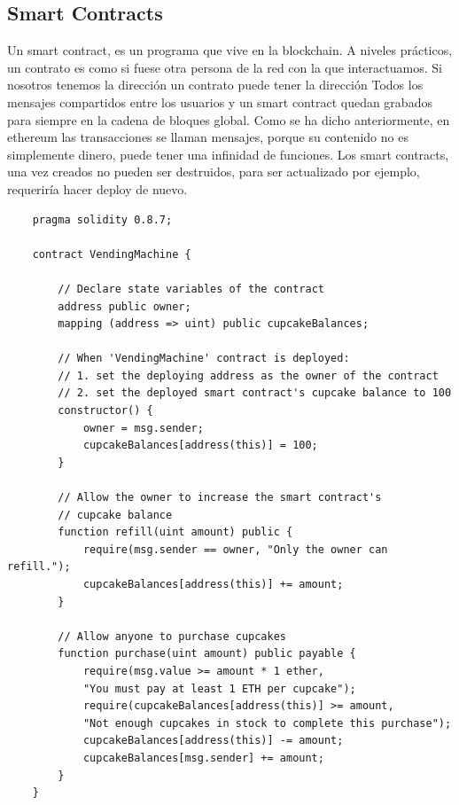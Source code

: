 \subsection*{Smart Contracts}
Un smart contract, es un programa que vive en la blockchain. A niveles prácticos, un contrato es como si fuese otra persona de la red con la que interactuamos.
Si nosotros tenemos la dirección
un contrato puede tener la dirección
Todos los mensajes compartidos entre los usuarios y un smart contract quedan grabados para siempre en la cadena de bloques global. Como se ha dicho anteriormente, en ethereum las transacciones se llaman mensajes, porque su contenido no es simplemente dinero, puede tener una infinidad de funciones.
Los smart contracts, una vez creados no pueden ser destruidos, para ser actualizado por ejemplo, requeriría hacer deploy de nuevo.
\begin{lstlisting}
    pragma solidity 0.8.7;

    contract VendingMachine {
    
        // Declare state variables of the contract
        address public owner;
        mapping (address => uint) public cupcakeBalances;
    
        // When 'VendingMachine' contract is deployed:
        // 1. set the deploying address as the owner of the contract
        // 2. set the deployed smart contract's cupcake balance to 100
        constructor() {
            owner = msg.sender;
            cupcakeBalances[address(this)] = 100;
        }
    
        // Allow the owner to increase the smart contract's 
        // cupcake balance
        function refill(uint amount) public {
            require(msg.sender == owner, "Only the owner can refill.");
            cupcakeBalances[address(this)] += amount;
        }
    
        // Allow anyone to purchase cupcakes
        function purchase(uint amount) public payable {
            require(msg.value >= amount * 1 ether, 
            "You must pay at least 1 ETH per cupcake");
            require(cupcakeBalances[address(this)] >= amount,
            "Not enough cupcakes in stock to complete this purchase");
            cupcakeBalances[address(this)] -= amount;
            cupcakeBalances[msg.sender] += amount;
        }
    }
\end{lstlisting}
